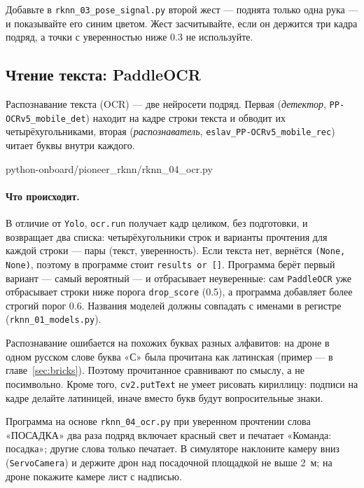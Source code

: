 \begin{taskbox}
Добавьте в \texttt{rknn\_03\_pose\_signal.py} второй жест --- поднята только одна рука --- и показывайте его синим цветом. Жест засчитывайте, если он держится три кадра подряд, а точки с уверенностью ниже 0.3 не используйте.
\end{taskbox}

\subsection{Чтение текста: PaddleOCR}

Распознавание текста (OCR) --- две нейросети подряд. Первая (\emph{детектор}, \texttt{PP-OCRv5\_mobile\_det}) находит на кадре строки текста и обводит их четырёхугольниками, вторая (\emph{распознаватель}, \texttt{eslav\_PP-OCRv5\_mobile\_rec}) читает буквы внутри каждого.

\begin{codefile}[python]{python-onboard/pioneer_rknn/rknn_04_ocr.py}
\end{codefile}

\paragraph{Что происходит.} В отличие от \verb|Yolo|, \verb|ocr.run| получает кадр целиком, без подготовки, и возвращает два списка: четырёхугольники строк и варианты прочтения для каждой строки --- пары (текст, уверенность). Если текста нет, вернётся \verb|(None, None)|, поэтому в программе стоит \verb|results or []|. Программа берёт первый вариант --- самый вероятный --- и отбрасывает неуверенные: сам \verb|PaddleOCR| уже отбрасывает строки ниже порога \verb|drop_score| (0.5), а программа добавляет более строгий порог 0.6. Названия моделей должны совпадать с именами в регистре (\texttt{rknn\_01\_models.py}).

Распознавание ошибается на похожих буквах разных алфавитов: на дроне в одном русском слове буква «С» была прочитана как латинская (пример --- в главе~\ref{sec:bricks}). Поэтому прочитанное сравнивают по смыслу, а не посимвольно. Кроме того, \verb|cv2.putText| не умеет рисовать кириллицу: подписи на кадре делайте латиницей, иначе вместо букв будут вопросительные знаки.

\begin{taskbox}
Программа на основе \texttt{rknn\_04\_ocr.py} при уверенном прочтении слова «ПОСАДКА» два раза подряд включает красный свет и печатает «Команда: посадка»; другие слова только печатает. В симуляторе наклоните камеру вниз (\verb|ServoCamera|) и держите дрон над посадочной площадкой не выше 2~м; на дроне покажите камере лист с надписью.
\end{taskbox}

